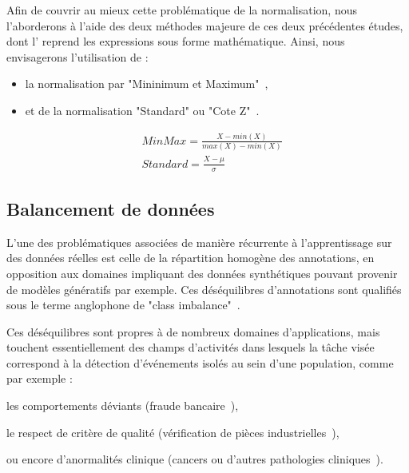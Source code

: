 Afin de couvrir au mieux cette problématique de la normalisation, nous l'aborderons à l'aide des deux méthodes majeure de ces deux précédentes études, dont l' reprend les expressions sous forme mathématique. Ainsi, nous envisagerons l'utilisation de :
\begin{itemize}
    \item la normalisation par "Mininimum et Maximum"~\cite{Juszczak2002},
    \item et de la normalisation "Standard" ou "Cote Z"~\cite{Celebi2007}.
\end{itemize}\par

\begin{equation} 
    \label{eq:scaling_methods}
    \begin{split}
    &MinMax=\frac{X-min(X)}{max(X)-min(X)}  \\
    &Standard=\frac{X-\mu{}}{\sigma}	    
    \end{split}
\end{equation}

\subsection{Balancement de données}
L'une des problématiques associées de manière récurrente à l'apprentissage sur des données réelles est celle de la répartition homogène des annotations, en opposition aux domaines impliquant des données synthétiques pouvant provenir de modèles génératifs par exemple. Ces déséquilibres d'annotations sont qualifiés sous le terme anglophone de "class imbalance"~\cite{Prati2009, He2009}.\par

Ces déséquilibres sont propres à de nombreux domaines d'applications, mais touchent essentiellement des champs d'activités dans lesquels la tâche visée correspond à la détection d'événements isolés au sein d'une population, comme par exemple : 
\begin{inlinerate}
    \item les comportements déviants (fraude bancaire~\cite{Phua2004}),
    \item le respect de critère de qualité (vérification de pièces industrielles~\cite{Wu2018}),
    \item ou encore d'anormalités clinique (cancers ou d'autres pathologies cliniques~\cite{Celebi2007}).
\end{inlinerate}\par

